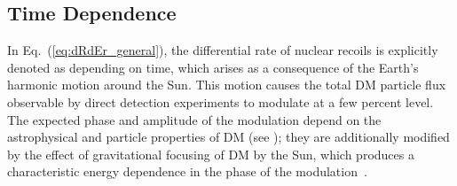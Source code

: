 \documentclass[11pt]{article}
\newcommand{\Eq}[1]{Eq.~(\ref{#1})} \newcommand{\Eqs}[2]{Eqs.~(\ref{#1}) and (\ref{#2})} \newcommand{\Eqm}[2]{Eqs.~(\ref{#1}) through (\ref{#2})}
\begin{document}
\subsection{Time Dependence}
\label{subsec:time}

In \Eq{eq:dRdEr_general}, the differential rate of nuclear recoils is explicitly denoted as depending on time, which arises as a consequence of the Earth's harmonic motion around the Sun. This motion causes the total DM particle flux observable by direct detection experiments to modulate at a few percent level. The expected phase and amplitude of the modulation depend on the astrophysical and particle properties of DM (see \eg \cite{Green:2000ga,Gelmini:2000dm,DelNobile:2015nua}); they are additionally modified by the effect of gravitational focusing of DM by the Sun, which produces a characteristic energy dependence in the phase of the modulation~\cite{Danby01021957,Griest:1987vc,Sikivie:2002bj,Alenazi:2006wu,Lee:2013wza,DelNobile:2015nua}. 
\end{document}
